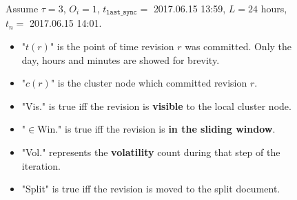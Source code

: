 \documentclass[abstracton,12pt]{scrreprt}
\begin{document}
\begin{figure}
    Assume $\tau = 3$, $O_i = 1$, $t_{\texttt{last\_sync}} = $ {\footnotesize 2017.06.15 13:59}, $L = 24$ hours, $t_n = $ {\footnotesize 2017.06.15 14:01}.
    \begin{itemize}
        \item "$t(r)$" is the point of time revision $r$ was committed. Only the day, hours and minutes are showed for brevity.
        \item "$c(r)$" is the cluster node which committed revision $r$.
        \item "Vis." is true iff the revision is \textbf{visible} to the local cluster node.
        \item "$\in$Win." is true iff the revision is \textbf{in the sliding window}.
        \item "Vol." represents the \textbf{volatility} count during that step of the iteration. 
        \item "Split" is true iff the revision is moved to the split document.
    \end{itemize}
\end{figure}



\end{document}
